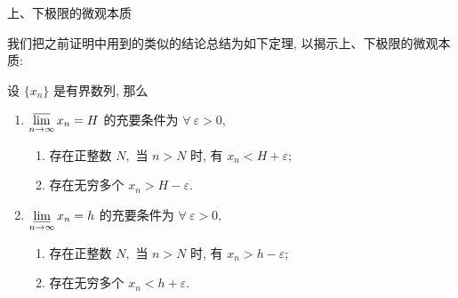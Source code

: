 \begin{frame}{上、下极限的微观本质}

我们把之前证明中用到的类似的结论总结为如下定理, 以揭示上、下极限的微观本质:

\begin{thm}
设 $\{x_n\}$ 是有界数列, 那么
\begin{enumerate}
\item $\varlimsup\limits_{n\to\infty} x_n = H$ 的充要条件为 $\forall~\varepsilon > 0,$
\begin{enumerate}
\item 存在正整数 $N,$ 当 $n > N$ 时, 有 $x_n < H + \varepsilon;$
\item 存在无穷多个 $x_n > H - \varepsilon.$
\end{enumerate}
\item $\varliminf\limits_{n\to\infty} x_n = h$ 的充要条件为 $\forall~\varepsilon > 0,$
\begin{enumerate}
\item 存在正整数 $N,$ 当 $n > N$ 时, 有 $x_n > h - \varepsilon;$
\item 存在无穷多个 $x_n < h + \varepsilon.$
\end{enumerate}
\end{enumerate}
\end{thm}
\end{frame}



